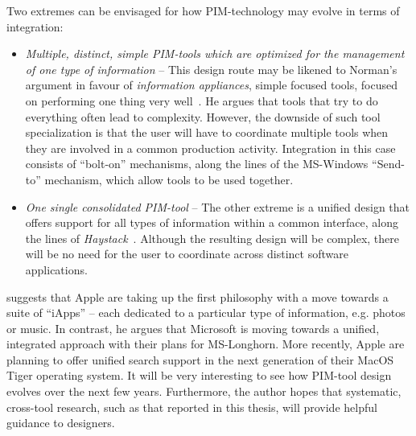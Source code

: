 Two extremes can be envisaged for how PIM-technology may evolve in terms of integration:

\begin{itemize}

\item \textit{Multiple, distinct, simple PIM-tools which are optimized for the management of one type of information} -- This design route may be likened to Norman's argument in favour of \textit{information appliances}, simple focused tools, focused on performing one thing very well~\citep{norman:98}.  He argues that tools that try to do everything often lead to complexity.  However, the downside of such tool specialization is that the user will have to coordinate multiple tools when they are involved in a common production activity.  Integration in this case consists of ``bolt-on'' mechanisms, along the lines of the MS-Windows ``Send-to'' mechanism, which allow tools to be used together.

\item \textit{One single consolidated PIM-tool} -- The other extreme is a unified design that offers support for all types of information within a common interface, along the lines of \textit{Haystack}~\citep{haystack:99}.  Although the resulting design will be complex, there will be no need for the user to coordinate across distinct software applications.

\end{itemize}

\citet{web-sjohnson:02} suggests that Apple are taking up the first philosophy with a move towards a suite of ``iApps'' -- each dedicated to a particular type of information, e.g. photos or music.  In contrast, he argues that Microsoft is moving towards a unified, integrated approach with their plans for MS-Longhorn.  More recently, Apple are planning to offer unified search support in the next generation of their MacOS Tiger operating system.  It will be very interesting to see how PIM-tool design evolves over the next few years.  Furthermore, the author hopes that systematic, cross-tool research, such as that reported in this thesis, will provide helpful guidance to designers.





